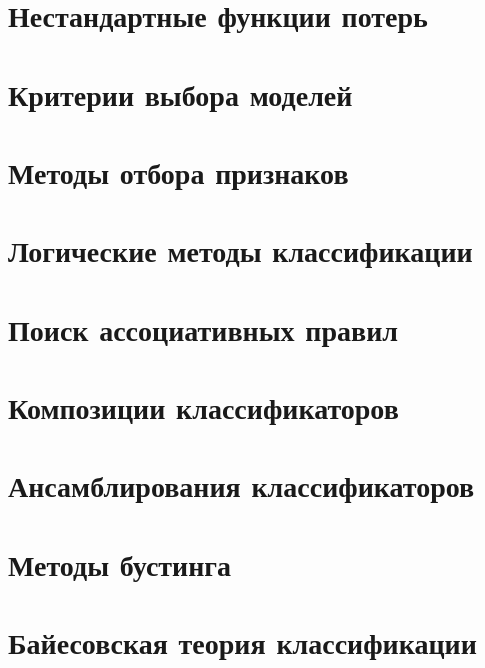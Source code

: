 \documentclass{disser}
\theoremstyle{definition}
\theoremstyle{definition}
\theoremstyle{definition}
\theoremstyle{remark}
\theoremstyle{remark}
\begin{document}
    \chapter{Нестандартные функции потерь}
    

    \clearpage
    \chapter{Критерии выбора моделей}
    

    \clearpage
    \chapter{Методы отбора признаков}
    

    \clearpage
    \chapter{Логические методы классификации}
    

    \clearpage
    \chapter{Поиск ассоциативных правил}
    

    \clearpage
    \chapter{Композиции классификаторов}
    

    \clearpage
    \chapter{Ансамблирования классификаторов}
    

    \clearpage
    \chapter{Методы бустинга}
    

    \clearpage
    \chapter{Байесовская теория классификации}
    
\end{document}
